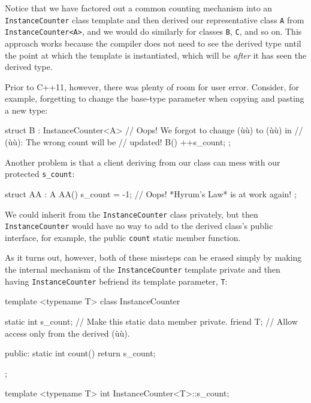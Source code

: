 \noindent Notice that we have factored out a common counting mechanism into an
\lstinline!InstanceCounter! class template and then derived our
representative class \lstinline!A! from \lstinline!InstanceCounter<A>!, and we
would do similarly for classes \lstinline!B!, \lstinline!C!, and so on. This
approach works because the compiler does not need to see the derived
type until the point at which the template is instantiated, which will
be \emph{after} it has seen the derived type.

Prior to C++11, however, there was plenty of room for user error.
Consider, for example, forgetting to change the base-type parameter when
copying and pasting a new type:

\begin{emcppslisting}[emcppsbatch=e4]
struct B : InstanceCounter<A>  // Oops! We forgot to change (ù{}ù) to (ù{}ù) in
                               // (ù{}ù): The wrong count will be
                               // updated!
{
    B() { ++s_count; }
};
\end{emcppslisting}

\noindent Another problem is that a client deriving from our class can mess with
our protected \lstinline!s_count!:

\begin{emcppslisting}[emcppsbatch=e4]
struct AA : A
{
    AA() { s_count = -1; }  // Oops! *Hyrum's Law* is at work again!
};
\end{emcppslisting}

\noindent We could inherit from the \lstinline!InstanceCounter! class privately, but
then \lstinline!InstanceCounter! would have no way to add to the derived
class's public interface, for example, the public \lstinline!count! static
member function.

As it turns out, however, both of these missteps can be erased simply by
making the internal mechanism of the \lstinline!InstanceCounter! template
private and then having \mbox{\lstinline!InstanceCounter!} befriend its template
parameter, \lstinline!T!:

\begin{emcppslisting}
template <typename T>
class InstanceCounter
{
    static int s_count;  // Make this static data member private.
    friend T;            // Allow access only from the derived (ù{}ù).

public:
    static int count() { return s_count; }
};

template <typename T>
int InstanceCounter<T>::s_count;
\end{emcppslisting}

